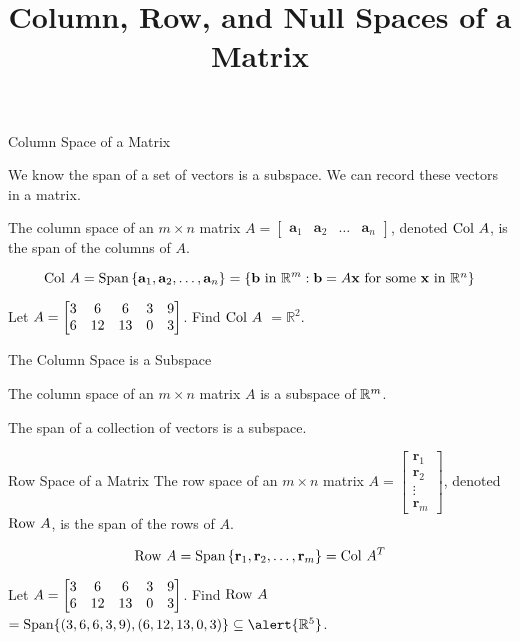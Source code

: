 \documentclass[xcolor=dvipsnames,aspectratio=169,t]{beamer}
\title{Column, Row, and Null Spaces of a Matrix}
\begin{document}
\maketitle

\begin{frame}{Column Space of a Matrix}

We know the \alert{span} of a set of vectors is a \alert{subspace}.  We can record these vectors in a matrix.

\pause
\bbox
The \alert{column space} of an $m \times n$ matrix $A = \begin{bmatrix} \mathbf{a}_1 &  \mathbf{a}_2 & \ldots &  \mathbf{a}_n  \end{bmatrix}$, denoted \alert{$\mbox{Col } A$}, is the span of the columns of $A$.

\[ \mbox{Col } A = \mbox{Span} \left\{ \mathbf{a}_1 , \mathbf{a}_2 , \ldots ,  \mathbf{a}_n \right\} = \left\{ \mathbf{b} \mbox{ in } \mathbb{R}^m : \mathbf{b} = A \mathbf{x} \mbox{ for some $\mathbf{x}$ in $\mathbb{R}^n$} \right\} \]
\ebox

\vspace{1em}

\pause
Let $\displaystyle A = \begin{bmatrix} 3 & 6 & 6 & 3 & 9 \\ 6 & 12 & 13 & 0 & 3 \end{bmatrix}$. Find $\mbox{Col } A$
\pause
$=\mathbb{R}^2$.

\end{frame}

\begin{frame}{The Column Space is a Subspace}
  \bigskip
  
  \begin{theorem}
  The column space of an $m \times n$ matrix $A$ is a \alert{subspace} of $\mathbb{R}^m$.
  \end{theorem}
  \bigskip
  
  \pause
  The \alert{span} of a collection of vectors is a subspace.
\end{frame}


\begin{frame}{Row Space of a Matrix}
  \bbox
  The \alert{row space} of an $m \times n$ matrix $A = \begin{bmatrix} \mathbf{r}_1 \\  \mathbf{r}_2 \\ \vdots \\  \mathbf{r}_m  \end{bmatrix}$, denoted \alert{$\mbox{Row } A$}, is the span of the rows of $A$.

  \[ \mbox{Row } A = \mbox{Span} \left\{ \mathbf{r}_1 , \mathbf{r}_2 , \ldots ,  \mathbf{r}_m \right\} = \mbox{Col } A^T  \]
  \ebox
  \bigskip

  \pause
  Let $\displaystyle A = \begin{bmatrix} 3 & 6 & 6 & 3 & 9 \\ 6 & 12 & 13 & 0 & 3 \end{bmatrix}$. Find $\mbox{Row } A$
  \pause
  $= \text{Span} \{(3,6,6,3,9),(6,12,13,0,3)\} \subseteq \alert{\mathbb{R}^5}$.
\end{frame}
\end{document}
